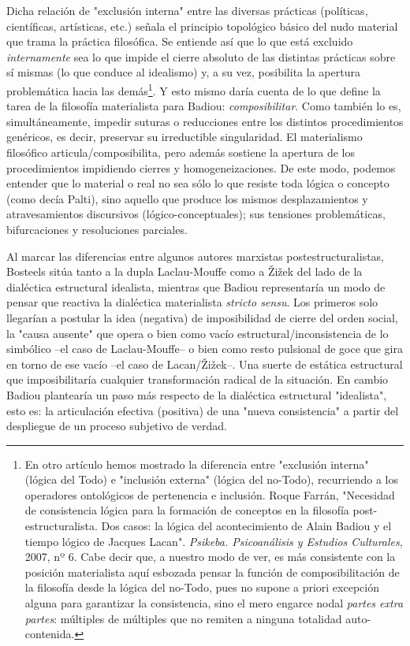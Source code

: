 \documentclass{book}
\begin{document}
Dicha relación de "exclusión interna" entre las diversas prácticas
(políticas, científicas, artísticas, etc.) señala el principio
topológico básico del nudo material que trama la práctica filosófica. Se
entiende así que lo que está excluido \emph{internamente} sea lo que
impide el cierre absoluto de las distintas prácticas sobre sí mismas (lo
que conduce al idealismo) y, a su vez, posibilita la apertura
problemática hacia las demás\footnote{En otro artículo hemos mostrado la
  diferencia entre "exclusión interna" (lógica del Todo) e "inclusión
  externa" (lógica del no-Todo), recurriendo a los operadores
  ontológicos de pertenencia e inclusión. Roque Farrán, "Necesidad de
  consistencia lógica para la formación de conceptos en la filosofía
  post-estructuralista. Dos casos: la lógica del acontecimiento de Alain
  Badiou y el tiempo lógico de Jacques Lacan". \emph{Psikeba.
  Psicoanálisis y Estudios Culturales}, 2007, nº 6. Cabe decir que, a
  nuestro modo de ver, es más consistente con la posición materialista
  aquí esbozada pensar la función de composibilitación de la filosofía
  desde la lógica del no-Todo, pues no supone a priori excepción alguna
  para garantizar la consistencia, sino el mero engarce nodal
  \emph{partes extra partes}: múltiples de múltiples que no remiten a
  ninguna totalidad auto-contenida.}. Y esto mismo daría cuenta de lo
que define la tarea de la filosofía materialista para Badiou:
\emph{composibilitar}. Como también lo es, simultáneamente, impedir
suturas o reducciones entre los distintos procedimientos genéricos, es
decir, preservar su irreductible singularidad. El materialismo
filosófico articula/composibilita, pero además sostiene la apertura de
los procedimientos impidiendo cierres y homogeneizaciones. De este modo,
podemos entender que lo material o real no sea sólo lo que resiste toda
lógica o concepto (como decía Palti), sino aquello que produce los
mismos desplazamientos y atravesamientos discursivos
(lógico-conceptuales); sus tensiones problemáticas, bifurcaciones y
resoluciones parciales.

Al marcar las diferencias entre algunos autores marxistas
postestructuralistas, Bosteels sitúa tanto a la dupla Laclau-Mouffe como
a Žižek del lado de la dialéctica estructural idealista, mientras que
Badiou representaría un modo de pensar que reactiva la dialéctica
materialista \emph{stricto sensu}. Los primeros solo llegarían a
postular la idea (negativa) de imposibilidad de cierre del orden social,
la "causa ausente" que opera o bien como vacío
estructural/inconsistencia de lo simbólico --el caso de Laclau-Mouffe--
o bien como resto pulsional de goce que gira en torno de ese vacío --el
caso de Lacan/Žižek--. Una suerte de estática estructural que
imposibilitaría cualquier transformación radical de la situación. En
cambio Badiou plantearía un paso más respecto de la dialéctica
estructural "idealista", esto es: la articulación efectiva (positiva) de
una "nueva consistencia" a partir del despliegue de un proceso subjetivo
de verdad.
\end{document}
